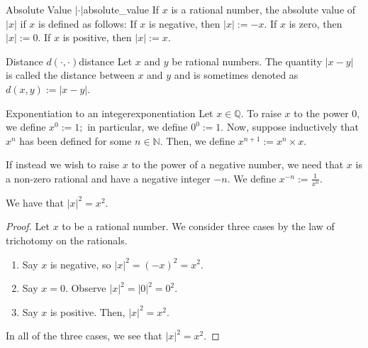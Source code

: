 \begin{definition}{Absolute Value $\lvert \cdot \rvert$}{absolute_value}
    If $x$ is a rational number, the absolute value of $\lvert x \rvert$ if $x$ is defined as follows:
    If $x$ is negative, then $\lvert x \rvert := -x.$
    If $x$ is zero, then $\lvert x \rvert := 0.$
    If $x$ is positive, then $\lvert x \rvert := x.$
\end{definition}

\begin{definition}{Distance $d(\cdot, \cdot)$}{distance}
    Let $x$ and $y$ be rational numbers. 
    The quantity $\lvert x - y \rvert$ is called the distance between $x$ and $y$ and is sometimes denoted as $d(x, y) := \lvert x - y \rvert.$
\end{definition}

\begin{definition}{Exponentiation to an integer}{exponentiation}
    Let $x \in \mathbb{Q}$.
    To raise $x$ to the power 0, we define $x^0 := 1;$ in particular, we define $0^0 := 1.$
    Now, suppose inductively that $x^n$ has been defined for some $n \in \mathbb{N}.$
    Then, we define $x^{n+1} := x^n \times x.$

    If instead we wish to raise $x$ to the power of a negative number, we need that $x$ is a non-zero rational and have a negative integer $-n.$
    We define $x^{-n} := \frac{1}{x^n}.$
    
\end{definition}

\begin{lemma}
    \label{lemma: abs_square}
    We have that $|x|^2 = x^2$.
\end{lemma}
\begin{proof}
    Let $x$ to be a rational number. 
    We consider three cases by the law of trichotomy on the rationals.
    \begin{enumerate}
        \item Say $x$ is negative, so $\lvert x \rvert ^2 = (-x)^2 = x^2.$
        \item Say $x = 0$. Observe $\lvert x \rvert^2 = \lvert 0 \rvert^2 =0^2.$
        \item Say $x$ is positive. Then, $\lvert x \rvert^2 = x^2$.
    \end{enumerate}
    In all of the three cases, we see that $\lvert x \rvert ^2 = x^2.$
\end{proof}

